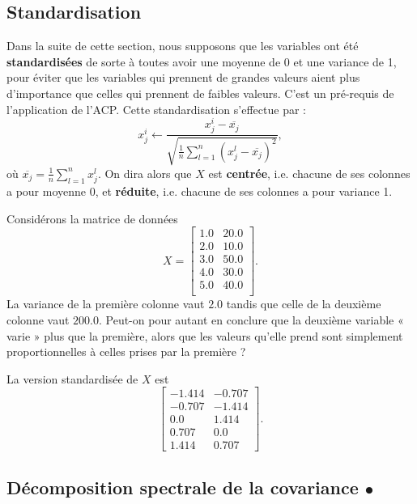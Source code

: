 \subsection{Standardisation}
Dans la suite de cette section, nous supposons que les variables ont été
\textbf{standardisées} de sorte à toutes avoir une moyenne de 0 et une variance
de 1, pour éviter que les variables qui prennent de grandes valeurs aient plus
d'importance que celles qui prennent de faibles valeurs. C'est un pré-requis de
l'application de l'ACP.  Cette standardisation s'effectue par :
\begin{equation}
  \label{eq:standardization}
  x^i_j \leftarrow \frac{x^i_j - \overline{x_j}}{\sqrt{\frac1n 
      \sum_{l=1}^n (x^l_j - \overline{x_j})^2}},
\end{equation}
où $\overline{x_j} = \frac1n \sum_{l=1}^n x^l_j.$ On dira alors que $X$ est
\textbf{centrée}, i.e. chacune de ses colonnes a pour moyenne 0, et \textbf{réduite}, i.e. chacune de ses colonnes a pour variance 1.

\begin{exemple}
  Considérons la matrice de données 
  \[
    X = \begin{bmatrix} 1.0 & 20.0 \\
      2.0 & 10.0 \\
      3.0 & 50.0 \\
      4.0 & 30.0 \\
      5.0 & 40.0 \\
    \end{bmatrix}.
  \]
  La variance de la première colonne vaut $2.0$ tandis que celle de la deuxième
  colonne vaut $200.0$. Peut-on pour autant en conclure que la deuxième
  variable « varie » plus que la première, alors que les valeurs qu'elle prend
  sont simplement proportionnelles à celles prises par la première ?

  La version standardisée de $X$ est
  \[
    \begin{bmatrix} -1.414 & -0.707 \\
      -0.707 & -1.414 \\
      0.0 & 1.414 \\
      0.707 & 0.0 \\
      1.414 & 0.707 
    \end{bmatrix}.
  \]
\end{exemple}


\subsection{Décomposition spectrale de la covariance $\bullet$}
